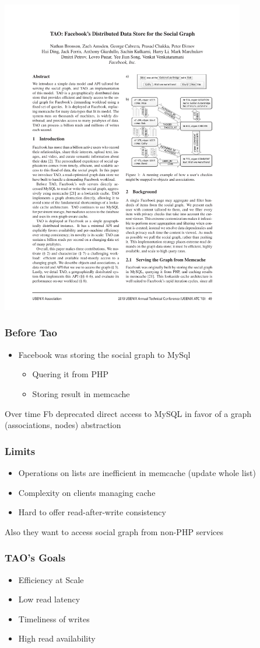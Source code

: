 \begin{frame}[t]
\begin{center}
\includegraphics[width=0.8\textwidth]{figs/social2}	
\end{center}


\end{frame}

\begin{frame}
\frametitle{Before Tao}
	\begin{itemize}
 	\item Facebook was storing the social graph to MySql
	\begin{itemize}
		\item  	Quering it from PHP
		\item  	Storing result in memcache\\
	\end{itemize}
	\end{itemize}
 	Over time Fb deprecated direct access to MySQL in favor of a graph (associations, nodes) abstraction
\end{frame}

\begin{frame}
\frametitle{Limits}
    \begin{itemize}
    	\item Operations on lists are inefficient in memcache (update whole list)
    	\item Complexity on clients managing cache
    	\item Hard to offer read-after-write consistency
    \end{itemize}
Also they want to access social graph from non-PHP services
\end{frame}

\begin{frame}
\frametitle{TAO's Goals}
	\begin{itemize}
		\item Efficiency at Scale
		\pause
		\item Low read latency
		\pause
		\item Timeliness of writes
		\pause
		\item High read availability
	\end{itemize}
\end{frame}
